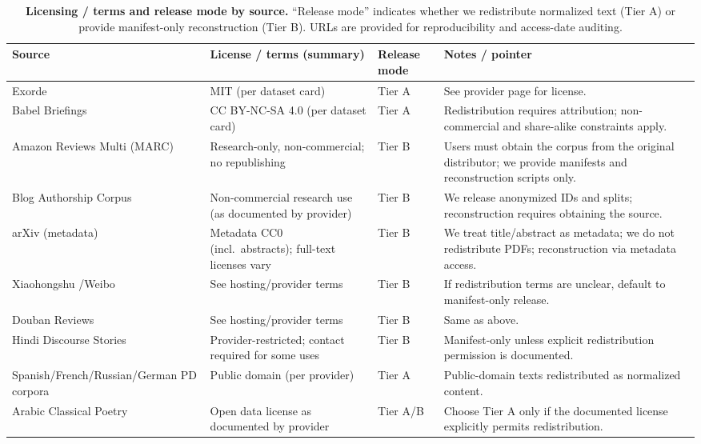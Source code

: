 \documentclass[11pt]{article}
\begin{document}
\begin{table}[t]
\small
\setlength{\tabcolsep}{6pt}
\renewcommand{\arraystretch}{1.25}
\centering
\caption{\textbf{Licensing / terms and release mode by source.} “Release mode” indicates whether we redistribute normalized text (Tier A) or provide manifest-only reconstruction (Tier B). URLs are provided for reproducibility and access-date auditing.}
\label{app:license-table}

\begin{tabularx}{\textwidth}{@{}
  >{\RaggedRight\arraybackslash}p{3.4cm}
  >{\RaggedRight\arraybackslash}X
  >{\centering\arraybackslash}p{1.6cm}
  >{\RaggedRight\arraybackslash}X
@{}}
\toprule
\textbf{Source} & \textbf{License / terms (summary)} & \textbf{Release mode} & \textbf{Notes / pointer} \\
\midrule
Exorde & MIT (per dataset card) & Tier A & See provider page for license. \\\addlinespace[2pt]
Babel Briefings & CC BY-NC-SA 4.0 (per dataset card) & Tier A & Redistribution requires attribution; non-commercial and share-alike constraints apply. \\\addlinespace[2pt]
Amazon Reviews Multi (MARC) & Research-only, non-commercial; no republishing & Tier B & Users must obtain the corpus from the original distributor; we provide manifests and reconstruction scripts only. \\\addlinespace[2pt]
Blog Authorship Corpus & Non-commercial research use (as documented by provider) & Tier B & We release anonymized IDs and splits; reconstruction requires obtaining the source. \\\addlinespace[2pt]
arXiv (metadata) & Metadata CC0 (incl.\ abstracts); full-text licenses vary & Tier B & We treat title/abstract as metadata; we do not redistribute PDFs; reconstruction via metadata access. \\\addlinespace[2pt]
Xiaohongshu \slash Weibo & See hosting/provider terms & Tier B & If redistribution terms are unclear, default to manifest-only release. \\\addlinespace[2pt]
Douban Reviews & See hosting/provider terms & Tier B & Same as above. \\\addlinespace[2pt]
Hindi Discourse Stories & Provider-restricted; contact required for some uses & Tier B & Manifest-only unless explicit redistribution permission is documented. \\\addlinespace[2pt]
Spanish\slash French\slash Russian\slash German PD corpora & Public domain (per provider) & Tier A & Public-domain texts redistributed as normalized content. \\\addlinespace[2pt]
Arabic Classical Poetry & Open data license as documented by provider & Tier A/B & Choose Tier A only if the documented license explicitly permits redistribution. \\
\bottomrule
\end{tabularx}

\vspace{2mm}
\end{table}
\end{document}
